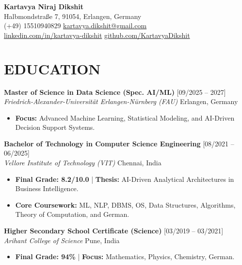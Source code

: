 \documentclass[a4paper,10pt]{article}
\begin{document}
\begin{center}
    {\Huge \textbf{\color{primarycolor} Kartavya Niraj Dikshit}} \\
    \vspace{4pt}
    \small
    Halbmondstraße 7, 91054, Erlangen, Germany \\
    \faPhone* (+49) 15510940829 \quad \faEnvelope \href{mailto:kartavya.dikshit@gmail.com}{kartavya.dikshit@gmail.com} \\
    \faLinkedin \href{http://www.linkedin.com/in/kartavya-dikshit}{linkedin.com/in/kartavya-dikshit} \quad \faGithub \href{https://github.com/KartavyaDikshit}{github.com/KartavyaDikshit}
\end{center}

\section{EDUCATION}
\noindent
\textbf{Master of Science in Data Science (Spec. AI/ML)} \hfill [09/2025 – 2027] \\
\textit{Friedrich-Alexander-Universität Erlangen-Nürnberg (FAU)} \hfill Erlangen, Germany
\begin{itemize}
    \item \textbf{Focus:} Advanced Machine Learning, Statistical Modeling, and AI-Driven Decision Support Systems.
\end{itemize}

\vspace{4pt}
\noindent
\textbf{Bachelor of Technology in Computer Science Engineering} \hfill [08/2021 – 06/2025] \\
\textit{Vellore Institute of Technology (VIT)} \hfill Chennai, India
\begin{itemize}
    \item \textbf{Final Grade: 8.2/10.0} | \textbf{Thesis:} AI-Driven Analytical Architectures in Business Intelligence.
    \item \textbf{Core Coursework:} ML, NLP, DBMS, OS, Data Structures, Algorithms, Theory of Computation, and German.
\end{itemize}

\vspace{4pt}
\noindent
\textbf{Higher Secondary School Certificate (Science)} \hfill [03/2019 – 03/2021] \\
\textit{Arihant College of Science} \hfill Pune, India
\begin{itemize}
    \item \textbf{Final Grade: 94\%} | \textbf{Focus:} Mathematics, Physics, Chemistry, German.
\end{itemize}
\end{document}
